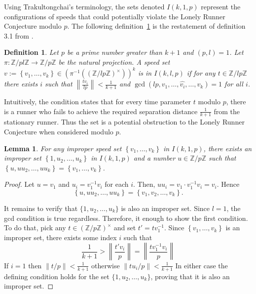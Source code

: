 \documentclass[10pt,leqno]{amsart}
\newtheorem{definition}[theorem]{Definition}
\newtheorem{lemma}[theorem]{Lemma}
\newcommand{\set}[1]{\left\{#1\right\}}
\newcommand{\norm}[1]{\left\|#1\right\|}
\newcommand{\Int}[1]{\mathbb Z / #1 \mathbb Z}
\newcommand{\Unit}[1]{(\Int{#1})^\times}
\begin{document}
Using Trakultongchai's terminology, the sets denoted $I(k,1,p)$ represent the configurations of speeds that could potentially 
violate the Lonely Runner Conjecture modulo $p$. The following definition~\ref{defimproper} is the restatement of definition 3.1 from \cite{Trakultongchai}.

\begin{definition}
  Let $p$ be a prime number greater than $k+1$ and $(p, l) = 1$.
  Let $\pi: \Int{pl} \to \Int{p}$ be the natural projection. 
  A speed set $v := \set{v_1, \dots, v_k} \in (\pi^{-1}(\Unit{lp}))^k$ is in $I(k, l, p)$ if for any 
  $t \in \Int{lp}$ there exists $i$ such that $\norm{\frac{tv_i}{lp}} < \frac{1}{k+1}$ and $\gcd(lp, v_1, \dots, \hat{v_i}, \dots, v_k) = 1$ 
  for all $i$.
  \label{defimproper}
\end{definition}

Intuitively, the condition states that for every time parameter $t$ modulo $p$, there is a runner who fails 
to achieve the required separation distance $\frac{1}{k+1}$ from the stationary runner. 
Thus the set is a potential obstruction to the Lonely Runner Conjecture when considered modulo $p$.

\begin{lemma}
  For any improper speed set $\set{v_1, \dots, v_k}$ in $I(k, 1, p)$, there exists an improper set
  $\set{1, u_2, \dots, u_k}$ in $I(k, 1, p)$ and a number $u \in \Int{p}$ such that 
  $\set{u, uu_2, \dots, uu_k} = \set{v_1, \dots, v_k}$.
  \label{lemmaprime}
\end{lemma}

\begin{proof}
  Let $u = v_1$ and $u_i = v_1^{-1} v_i$ for each $i$.  
  Then, $u u_i = v_1 \cdot v_1^{-1} v_i = v_i$. Hence
  \[
      \set{u, u u_2, \dots, u u_k} = \set{v_1, v_2, \dots, v_k}.
  \]
  
  It remains to verify that $\{1,u_2,\dots,u_k\}$ is also an improper set. Since $l = 1$, the gcd condition is true regardless.
  Therefore, it enough to show the first condition.
  To do that, pick any $t \in (\Int{p})^\times$ and set $t' = t v_1^{-1}$.
  Since $\set{v_1, \dots, v_k}$ is an improper set, there exists some index $i$ such that
  \[ \frac{1}{k+1} > \norm{\frac{t' v_i}{p}} = \norm{\frac{t v_1^{-1} v_i}{p}} \]
  If $i = 1$ then $\norm{t/p} < \frac{1}{k+1}$ otherwise $\norm{{t u_i}/{p}} < \frac{1}{k+1}$
  In either case the defining condition holds for the set $\{1,u_2,\dots,u_k\}$, proving that it is also an improper set.
\end{proof}
\end{document}
